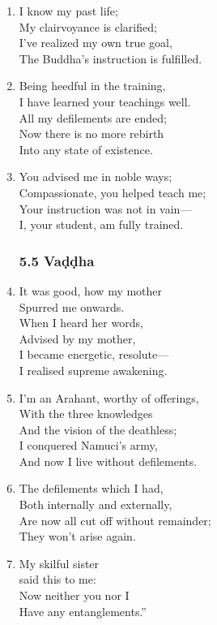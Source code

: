 \documentclass[10pt, openany]{book}
\newcommand*{\vleftofline}[1]{\leavevmode\llap{#1}}
\begin{document}
\begin{enumerate}
\item I know my past life;\\
My clairvoyance is clarified;\\
I’ve realized my own true goal,\\
The Buddha’s instruction is fulfilled.

\item Being heedful in the training,\\
I have learned your teachings well.\\
All my defilements are ended;\\
Now there is no more rebirth \\
Into any state of existence.

\item You advised me in noble ways;\\
Compassionate, you helped teach me;\\
Your instruction was not in vain—\\
I, your student, am fully trained.

\subsubsection*{5.5 Vaḍḍha}

\item It was good, how my mother\\
Spurred me onwards.\\
When I heard her words,\\
Advised by my mother,\\
I became energetic, resolute—\\
I realised supreme awakening.

\item I’m an Arahant, worthy of offerings,\\
With the three knowledges \\
And the vision of the deathless;\\
I conquered Namuci’s army,\\
And now I live without defilements.

\item The defilements which I had,\\
Both internally and externally,\\
Are now all cut off without remainder;\\
They won’t arise again.

\item My skilful sister\\
said this to me:\\
\vleftofline{“}Now neither you nor I\\
Have any entanglements.”


\end{enumerate}
\end{document}

